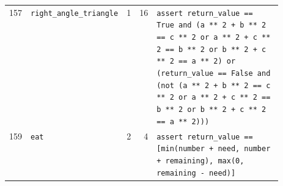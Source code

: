 \begin{footnotesize}
\begin{longtable}{@{}r l r r p{0.52\linewidth}@{}}
157 & \texttt{right\_angle\_triangle} & 1 & 16 & \texttt{assert \allowbreak{}return\_value \allowbreak{}=\allowbreak{}=\allowbreak{} \allowbreak{}True \allowbreak{}and \allowbreak{}(\allowbreak{}a \allowbreak{}*\allowbreak{}*\allowbreak{} \allowbreak{}2 \allowbreak{}+\allowbreak{} \allowbreak{}b \allowbreak{}*\allowbreak{}*\allowbreak{} \allowbreak{}2 \allowbreak{}=\allowbreak{}=\allowbreak{} \allowbreak{}c \allowbreak{}*\allowbreak{}*\allowbreak{} \allowbreak{}2 \allowbreak{}or \allowbreak{}a \allowbreak{}*\allowbreak{}*\allowbreak{} \allowbreak{}2 \allowbreak{}+\allowbreak{} \allowbreak{}c \allowbreak{}*\allowbreak{}*\allowbreak{} \allowbreak{}2 \allowbreak{}=\allowbreak{}=\allowbreak{} \allowbreak{}b \allowbreak{}*\allowbreak{}*\allowbreak{} \allowbreak{}2 \allowbreak{}or \allowbreak{}b \allowbreak{}*\allowbreak{}*\allowbreak{} \allowbreak{}2 \allowbreak{}+\allowbreak{} \allowbreak{}c \allowbreak{}*\allowbreak{}*\allowbreak{} \allowbreak{}2 \allowbreak{}=\allowbreak{}=\allowbreak{} \allowbreak{}a \allowbreak{}*\allowbreak{}*\allowbreak{} \allowbreak{}2)\allowbreak{} \allowbreak{}or \allowbreak{}(\allowbreak{}return\_value \allowbreak{}=\allowbreak{}=\allowbreak{} \allowbreak{}False \allowbreak{}and \allowbreak{}(\allowbreak{}not \allowbreak{}(\allowbreak{}a \allowbreak{}*\allowbreak{}*\allowbreak{} \allowbreak{}2 \allowbreak{}+\allowbreak{} \allowbreak{}b \allowbreak{}*\allowbreak{}*\allowbreak{} \allowbreak{}2 \allowbreak{}=\allowbreak{}=\allowbreak{} \allowbreak{}c \allowbreak{}*\allowbreak{}*\allowbreak{} \allowbreak{}2 \allowbreak{}or \allowbreak{}a \allowbreak{}*\allowbreak{}*\allowbreak{} \allowbreak{}2 \allowbreak{}+\allowbreak{} \allowbreak{}c \allowbreak{}*\allowbreak{}*\allowbreak{} \allowbreak{}2 \allowbreak{}=\allowbreak{}=\allowbreak{} \allowbreak{}b \allowbreak{}*\allowbreak{}*\allowbreak{} \allowbreak{}2 \allowbreak{}or \allowbreak{}b \allowbreak{}*\allowbreak{}*\allowbreak{} \allowbreak{}2 \allowbreak{}+\allowbreak{} \allowbreak{}c \allowbreak{}*\allowbreak{}*\allowbreak{} \allowbreak{}2 \allowbreak{}=\allowbreak{}=\allowbreak{} \allowbreak{}a \allowbreak{}*\allowbreak{}*\allowbreak{} \allowbreak{}2)\allowbreak{})\allowbreak{})\allowbreak{}} \\
159 & \texttt{eat} & 2 & 4 & \texttt{assert \allowbreak{}return\_value \allowbreak{}=\allowbreak{}=\allowbreak{} \allowbreak{}[\allowbreak{}min(\allowbreak{}number \allowbreak{}+\allowbreak{} \allowbreak{}need,\allowbreak{} \allowbreak{}number \allowbreak{}+\allowbreak{} \allowbreak{}remaining)\allowbreak{},\allowbreak{} \allowbreak{}max(\allowbreak{}0,\allowbreak{} \allowbreak{}remaining \allowbreak{}-\allowbreak{} \allowbreak{}need)\allowbreak{}]\allowbreak{}} \\

\end{longtable}
\end{footnotesize}
